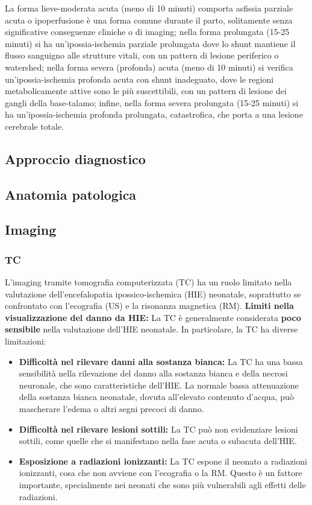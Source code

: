 La forma lieve-moderata acuta (meno di 10 minuti) comporta asfissia parziale acuta o ipoperfusione è una forma comune durante il parto, solitamente senza significative conseguenze cliniche o di imaging; nella forma prolungata (15-25 minuti) si ha un'ipossia-ischemia parziale prolungata dove lo shunt mantiene il flusso sanguigno alle strutture vitali, con un pattern di lesione periferico o watershed; nella forma severa (profonda) acuta (meno di 10 minuti) si verifica un'ipossia-ischemia profonda acuta con shunt inadeguato, dove le regioni metabolicamente attive sono le più suscettibili, con un pattern di lesione dei gangli della base-talamo; infine, nella forma severa prolungata (15-25 minuti) si ha un'ipossia-ischemia profonda prolungata, catastrofica, che porta a una lesione cerebrale totale.

\subsection{Approccio diagnostico}

\subsection{Anatomia patologica}

\subsection{Imaging}

\subsubsection{TC}

L'imaging tramite tomografia computerizzata (TC) ha un ruolo limitato nella valutazione dell'encefalopatia ipossico-ischemica (HIE) neonatale, soprattutto se confrontato con l'ecografia (US) e la risonanza magnetica (RM).
\textbf{Limiti nella visualizzazione del danno da HIE:} La TC è generalmente considerata \textbf{poco sensibile} nella valutazione dell'HIE neonatale. In particolare, la TC ha diverse limitazioni:

\begin{itemize}
	\tightlist
	\item
	\textbf{Difficoltà nel rilevare danni alla sostanza bianca:} La TC ha una bassa sensibilità nella rilevazione del danno alla sostanza bianca e della necrosi neuronale, che sono caratteristiche dell'HIE. La normale bassa attenuazione della sostanza bianca neonatale, dovuta all'elevato contenuto d'acqua, può mascherare l'edema o altri segni precoci di danno.
	\item
	\textbf{Difficoltà nel rilevare lesioni sottili:} La TC può non evidenziare lesioni sottili, come quelle che si manifestano nella fase acuta o subacuta dell'HIE.
	\item
	\textbf{Esposizione a radiazioni ionizzanti:} La TC espone il neonato a radiazioni ionizzanti, cosa che non avviene con l'ecografia o la RM. Questo è un fattore importante, specialmente nei neonati che sono più vulnerabili agli effetti delle radiazioni.
\end{itemize}

